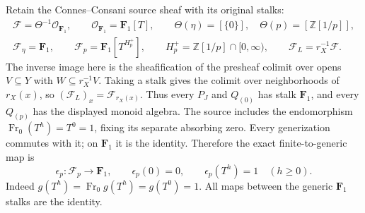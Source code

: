 Retain the Connes--Consani source sheaf with its original stalks:
\begin{equation}\tag{FGM16}
 \begin{gathered}
 \mathcal F=\Theta^{-1}\mathcal O_{\mathbf F_1},\qquad
 \mathcal O_{\mathbf F_1}=\mathbf F_1[T],\qquad
 \Theta(\eta)=[\{0\}],\quad\Theta(p)=[\mathbb Z[1/p]],\\
 \mathcal F_\eta=\mathbf F_1,\qquad
 \mathcal F_p=\mathbf F_1[T^{H_p^+}],\qquad
 H_p^+=\mathbb Z[1/p]\cap[0,\infty),\qquad
 \mathcal F_L=r_X^{-1}\mathcal F.
 \end{gathered}
\end{equation}
The inverse image here is the sheafification of the presheaf colimit
over opens $V\subseteq Y$ with $W\subseteq r_X^{-1}V$.
Taking a stalk gives the colimit over neighborhoods of $r_X(x)$,
so $(\mathcal F_L)_x=\mathcal F_{r_X(x)}$. Thus every $P_J$ and
$Q_{(0)}$ has stalk $\mathbf F_1$, and every $Q_{(p)}$ has the
displayed monoid algebra. The source includes the endomorphism
$\operatorname{Fr}_0(T^h)=T^0=1$, fixing its separate absorbing zero.
Every generization commutes with it; on $\mathbf F_1$ it is the
identity. Therefore the exact finite-to-generic map is
\begin{equation}\tag{FGM17}
 \epsilon_p:\mathcal F_p\longrightarrow\mathbf F_1,
 \qquad \epsilon_p(0)=0,\qquad\epsilon_p(T^h)=1\quad(h\ge0).
\end{equation}
Indeed $g(T^h)=\operatorname{Fr}_0g(T^h)=g(T^0)=1$.
All maps between the generic $\mathbf F_1$ stalks are the identity.

